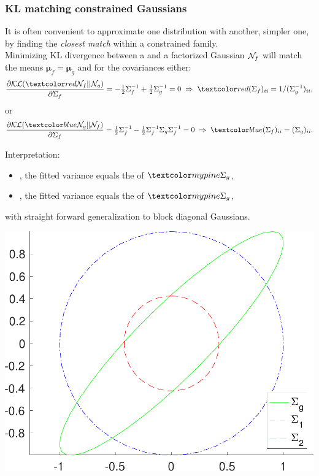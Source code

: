 \begin{frame}
\frametitle{KL matching constrained Gaussians}

It is often convenient to approximate one distribution with another,
simpler one, by finding the \emph{closest match} within a constrained family.\\[1ex]

Minimizing KL divergence between a  and a
factorized Gaussian ${\cal N}_f$ will match the means
$\boldsymbol\mu_f=\boldsymbol\mu_g$ and for the covariances either:
\[
\frac{\partial {\KL}(\Red{{\cal N}_f}||{\cal N}_g)}{\partial\Sigma_f}=
-\tfrac{1}{2}\Sigma_f^{-1}+\tfrac{1}{2}\Sigma_g^{-1}=0\;\Rightarrow\;
\Red{(\Sigma_f)_{ii} = 1/(\Sigma_g^{-1})_{ii}},
\]
or
\[
\frac{\partial {\KL}(\Blue{{\cal N}_g}||{\cal N}_f)}{\partial\Sigma_f}=
\tfrac{1}{2}\Sigma_f^{-1}-\tfrac{1}{2}\Sigma_f^{-1}\Sigma_g\Sigma_f^{-1}=0\;
\Rightarrow\;\Blue{(\Sigma_f)_{ii} = (\Sigma_g)_{ii}}.
\]
%
\parbox{0.7\linewidth}{
Interpretation:
\begin{itemize}
\item {}, the fitted variance
equals the  of $\Green{\Sigma_g}$,
\item {}, the fitted variance
equals the  of $\Green{\Sigma_g}$,
\end{itemize}
with straight forward generalization to block diagonal Gaussians.
}
\parbox{0.29\linewidth}{
\hfill
\includegraphics[width=\linewidth]{kl}
}

\end{frame}

